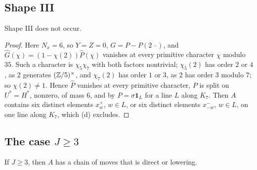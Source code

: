\subsection{Shape III}

\begin{lemma}\label{lem:shapeIII}
Shape \textup{III} does not occur.
\end{lemma}

\begin{proof}
Here $N_{x}=6$, so $Y=Z=0$, $G=P-P(2\,\cdot)$, and $\hat G(\chi)=(1-\chi(2))
\hat P(\chi)$ vanishes at every primitive character $\chi$ modulo $35$. Such a
character is $\chi_{5}\chi_{7}$ with both factors nontrivial; $\chi_{5}(2)$
has order $2$ or $4$, as $2$ generates $(\mathbb{Z}/5)^{\times}$, and $\chi_{7}(2)$
has order $1$ or $3$, as $2$ has order $3$ modulo $7$; so $\chi(2)\ne1$. Hence
$\hat P$ vanishes at every primitive character, $P$ is split on
$U^{*}=H^{*}$, nonzero, of mass $6$, and by  $P=\sigma\mathbf
1_{L}$ for a line $L$ along $K_{7}$. Then $A$ contains six distinct elements
$x^{+}_{w}$, $w\in L$, or six distinct elements $x^{-}_{-w}$, $w\in L$, on one
line along $K_{7}$, which (d) excludes.
\end{proof}

\subsection{The case \texorpdfstring{$J\ge3$}{J>=3}}

\begin{lemma}\label{lem:Jthree}
If $J\ge3$, then $A$ has a chain of moves that is direct or lowering.
\end{lemma}


